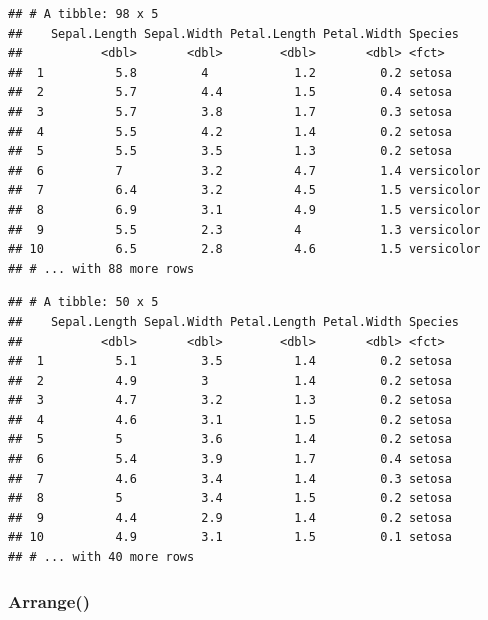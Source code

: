 \documentclass[
]{article}
\newenvironment{Shaded}{\begin{snugshade}}{\end{snugshade}}
\newcommand{\CommentTok}[1]{\textcolor[rgb]{0.56,0.35,0.01}{\textit{#1}}}
\newcommand{\KeywordTok}[1]{\textcolor[rgb]{0.13,0.29,0.53}{\textbf{#1}}}
\newcommand{\NormalTok}[1]{#1}
\newcommand{\OperatorTok}[1]{\textcolor[rgb]{0.81,0.36,0.00}{\textbf{#1}}}
\newcommand{\StringTok}[1]{\textcolor[rgb]{0.31,0.60,0.02}{#1}}
\begin{document}
\begin{verbatim}
## # A tibble: 98 x 5
##    Sepal.Length Sepal.Width Petal.Length Petal.Width Species   
##           <dbl>       <dbl>        <dbl>       <dbl> <fct>     
##  1          5.8         4            1.2         0.2 setosa    
##  2          5.7         4.4          1.5         0.4 setosa    
##  3          5.7         3.8          1.7         0.3 setosa    
##  4          5.5         4.2          1.4         0.2 setosa    
##  5          5.5         3.5          1.3         0.2 setosa    
##  6          7           3.2          4.7         1.4 versicolor
##  7          6.4         3.2          4.5         1.5 versicolor
##  8          6.9         3.1          4.9         1.5 versicolor
##  9          5.5         2.3          4           1.3 versicolor
## 10          6.5         2.8          4.6         1.5 versicolor
## # ... with 88 more rows
\end{verbatim}

\begin{Shaded}
\end{Shaded}

\begin{verbatim}
## # A tibble: 50 x 5
##    Sepal.Length Sepal.Width Petal.Length Petal.Width Species
##           <dbl>       <dbl>        <dbl>       <dbl> <fct>  
##  1          5.1         3.5          1.4         0.2 setosa 
##  2          4.9         3            1.4         0.2 setosa 
##  3          4.7         3.2          1.3         0.2 setosa 
##  4          4.6         3.1          1.5         0.2 setosa 
##  5          5           3.6          1.4         0.2 setosa 
##  6          5.4         3.9          1.7         0.4 setosa 
##  7          4.6         3.4          1.4         0.3 setosa 
##  8          5           3.4          1.5         0.2 setosa 
##  9          4.4         2.9          1.4         0.2 setosa 
## 10          4.9         3.1          1.5         0.1 setosa 
## # ... with 40 more rows
\end{verbatim}

\hypertarget{arrange}{%
\subsubsection{Arrange()}\label{arrange}}
\end{document}
